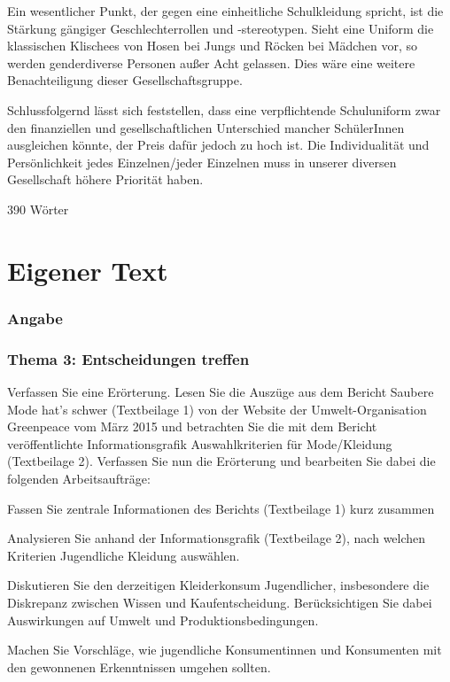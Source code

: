 Ein wesentlicher Punkt, der gegen eine einheitliche Schulkleidung spricht, ist die Stärkung gängiger Geschlechterrollen und -stereotypen. Sieht eine Uniform die klassischen Klischees von Hosen bei Jungs und Röcken bei Mädchen vor, so werden genderdiverse Personen außer Acht gelassen. Dies wäre eine weitere Benachteiligung dieser Gesellschaftsgruppe. 

Schlussfolgernd lässt sich feststellen, dass eine verpflichtende Schuluniform zwar den finanziellen und gesellschaftlichen Unterschied mancher SchülerInnen ausgleichen könnte, der Preis dafür jedoch zu hoch ist. Die Individualität und Persönlichkeit jedes Einzelnen/jeder Einzelnen muss in unserer diversen Gesellschaft höhere Priorität haben. 

390 Wörter 

\newpage
\section{Eigener Text}
\subsubsection{Angabe}
\subsubsection{Thema 3: Entscheidungen treffen }
Verfassen Sie eine Erörterung.
Lesen Sie die Auszüge aus dem Bericht Saubere Mode hat’s schwer (Textbeilage 1) von der
Website der Umwelt-Organisation Greenpeace vom März 2015 und betrachten Sie die mit dem
Bericht veröffentlichte Informationsgrafik Auswahlkriterien für Mode/Kleidung (Textbeilage 2).
Verfassen Sie nun die Erörterung und bearbeiten Sie dabei die folgenden Arbeitsaufträge:

\begin{compactitem}
    \item Fassen Sie zentrale Informationen des Berichts (Textbeilage 1) kurz zusammen
    \item Analysieren Sie anhand der Informationsgrafik (Textbeilage 2), nach welchen Kriterien
    Jugendliche Kleidung auswählen. 
    \item Diskutieren Sie den derzeitigen Kleiderkonsum Jugendlicher, insbesondere die Diskrepanz
    zwischen Wissen und Kaufentscheidung. Berücksichtigen Sie dabei Auswirkungen auf Umwelt und Produktionsbedingungen.
    \item Machen Sie Vorschläge, wie jugendliche Konsumentinnen und Konsumenten mit den gewonnenen Erkenntnissen umgehen sollten.
\end{compactitem}

